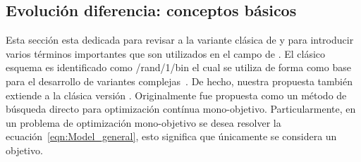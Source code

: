 \subsection{Evolución diferencia: conceptos básicos}

Esta sección esta dedicada para revisar a la variante clásica de \DE{} y para introducir varios términos importantes que son utilizados en el campo de \DE{}.
%
El clásico esquema \DE{} es identificado como \DE{}/rand/1/bin el cual se utiliza de forma como base para el desarrollo de variantes complejas~\cite{das2011differential}.
%
De hecho, nuestra propuesta también extiende a la clásica versión \DE{}.
%
Originalmente \DE{} fue propuesta como un método de búsqueda directo para optimización contínua mono-objetivo.
%
%
%
Particularmente, en un problema de optimización mono-objetivo se desea resolver la ecuación~\ref{eqn:Model_general}, esto significa que únicamente se considera un objetivo.

%

